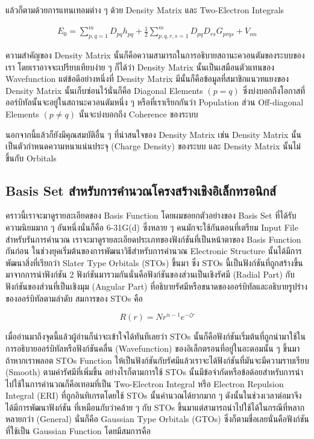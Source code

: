 \noindent แล้วก็ตามด้วยการแทนเทอมต่าง ๆ ด้วย Density Matrix และ Two-Electron Integrals

\begin{equation}
  \begin{aligned}
    E_0
    =
    \sum_{p, q=1}^m D_{p q} h_{p q}
    + \frac{1}{2} \sum_{p, q, r, s=1}^m D_{p q} D_{r s} G_{p r q s}+V_{n n}
  \end{aligned}
\end{equation}

ความสำคัญของ Density Matrix นั้นก็คือความสามารถในการอธิบายสถานะควอนตัมของระบบของเรา โดยเราอาจจะเปรียบเทียบง่าย ๆ ก็ได้ว่า
Density Matrix นั้นเป็นเสมือนตัวแทนของ Wavefunction แต่ข้อดีอย่างหนึ่งที่ Density Matrix มีนั้นก็คือข้อมูลที่สมาชิกแนวทแยงของ
Density Matrix นั้นเก็บซ่อนไว้นั่นก็คือ Diagonal Elements $(p = q)$ ซึ่งบ่งบอกถึงโอกาสที่ออร์บิทัลนั้นจะอยู่ในสถานะควอนตัมหนึ่ง ๆ
หรือที่เราเรียกกันว่า Population ส่วน Off-diagonal Elements $(p \neq q)$ นั้นจะบ่งบอกถึง Coherence ของระบบ

นอกจากนี้แล้วก็ยังมีคุณสมบัติอื่น ๆ ที่น่าสนใจของ Density Matrix เช่น Density Matrix นั้นเป็นตัวกำหนดความหนาแน่นประจุ (Charge
Density) ของระบบ และ Density Matrix นั้นไม่ขึ้นกับ Orbitals

\subsection{Basis Set สำหรับการคำนวณโครงสร้างเชิงอิเล็กทรอนิกส์}

คราวนี้เราจะมาดูรายละเอียดของ Basis Function โดยผมขอยกตัวอย่างของ Basis Set ที่ได้รับความนิยมมาก ๆ อันหนึ่งนั่นก็คือ 6-31G(d)
ซึ่งหลาย ๆ คนมักจะใช้กันตอนที่เตรียม Input File สำหรับรันการคำนวณ เราจะมาดูรายละเอียดประเภทของฟังก์ชันที่เป็นหน้าตาของ Basis Function
กันก่อน ในช่วงยุคเริ่มต้นของการพัฒนาวิธีสำหรับการคำนวณ Electronic Structure นั้นได้มีการพัฒนาสิ่งที่เรียกว่า Slater Type Orbitals
(STOs) ขึ้นมา ซึ่ง STOs นี้เป็นฟังก์ชันที่ถูกสร้างขึ้นมาจากการนำฟังก์ชัน 2 ฟังก์ชันมารวมกันนั่นคือฟังก์ชันของส่วนเป็นเชิงรัศมี (Radial Part)
กับฟังก์ชันของส่วนที่เป็นเชิงมุม (Angular Part) ที่อธิบายรัศมีหรือขนาดของออร์บิทัลและอธิบายรูปร่างของออร์บิทัลตามลำดับ สมการของ STOs คือ

\begin{equation}
  \label{eq:sto}
  R(r) = N r^{n - 1} e^{-\zeta r}
\end{equation}

เมื่ออ่านมาถึงจุดนี้แล้วผู้อ่านก็น่าจะเข้าใจได้ทันทีเลยว่า STOs นั้นก็คือฟังก์ชันเริ่มต้นที่ถูกนำมาใช้ในการอธิบายออร์บิทัลหรือฟังก์ชันคลื่น (Wavefunction)
ของอิเล็กตรอนที่อยู่ในอะตอมนั้น ๆ ขึ้นมา ถ้าหากเราพลอต STOs Function ให้เป็นฟังก์ชันกับรัศมีแล้วเราจะได้ฟังก์ชันที่มันจะมีความราบเรียบ (Smooth)
ตามค่ารัศมีที่เพิ่มขึ้น อย่างไรก็ตามการใช้ STOs นั้นมีข้อจำกัดหรือข้อด้อยสำหรับการนำไปใช้ในการคำนวณก็คือเทอมที่เป็น Two-Electron Integral
หรือ Electron Repulsion Integral (ERI) ที่ถูกอินทิเกรตโดยใช้ STOs นั้นคำนวณได้ยากมาก ๆ ดังนั้นในช่วงเวลาต่อมาจึงได้มีการพัฒนาฟังก์ชัน%
ที่เหมือนกับว่าคล้าย ๆ กับ STOs ขึ้นมาแต่สามารถนำไปใช้ได้ในกรณีที่หลากหลายกว่า (General) นั่นก็คือ Gaussian Type Orbitals (GTOs)
ซึ่งก็ตามชื่อเลยนั่นคือฟังก์ชันที่ใช้เป็น Gaussian Function โดยมีสมการคือ

